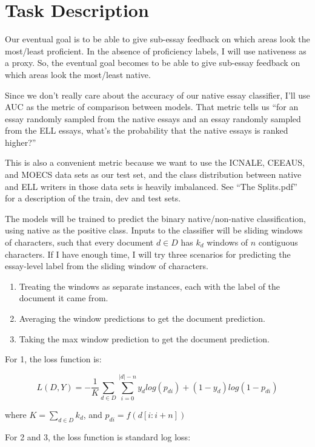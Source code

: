 \documentclass[12pt]{article}
\begin{document}
\section*{Task Description}
Our eventual goal is to be able to give sub-essay feedback on which areas look
the most/least proficient. In the absence of proficiency labels, I will use nativeness
as a proxy. So, the eventual goal becomes to be able to give sub-essay feedback
on which areas look the most/least native.

Since we don't really care about the accuracy of our native essay classifier, I'll
use AUC as the metric of comparison between models. That metric tells us ``for
an essay randomly sampled from the native essays and an essay randomly sampled
from the ELL essays, what's the probability that the native essays is ranked higher?''

This is also a convenient metric because we want to use the ICNALE, CEEAUS, and
MOECS data sets as our test set, and the class distribution between native and ELL
writers in those data sets is heavily imbalanced. See ``The Splits.pdf'' for a
description of the train, dev and test sets.

The models will be trained to predict the binary native/non-native classification,
using native as the positive class. Inputs to the classifier will be sliding windows
of characters, such that every document $d \in D$ has $k_d$ windows of $n$
contiguous characters. If I have
enough time, I will try three scenarios for predicting the essay-level label
from the sliding window of characters.

\begin{enumerate}
    \item Treating the windows as separate instances, each with the label of
    the document it came from.

    \item Averaging the window predictions to get the document prediction.

    \item Taking the max window prediction to get the document prediction.
\end{enumerate}

For 1, the loss function is:

$$L(D, Y) = -\frac{1}{K} \sum_{d \in D} \sum_{i=0}^{|d| - n} y_d log(p_{di}) + (1 - y_d) log(1 - p_{di}) $$

where $K = \sum_{d \in D} k_d$, and $p_{di} = f(d[i:i + n])$

For 2 and 3, the loss function is standard log loss:
\end{document}
